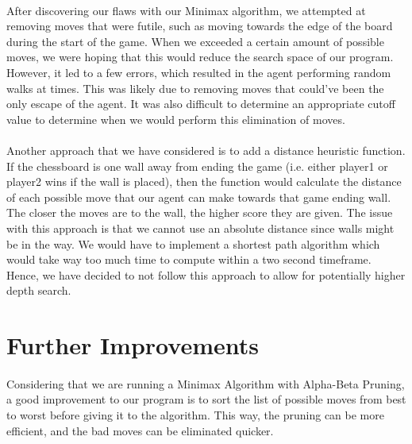 \documentclass[12pt,a4paper]{article}
\begin{document}
\paragraph{} After discovering our flaws with our Minimax algorithm, we attempted at removing moves that were futile, 
such as moving towards the edge of the board during the start of the game. 
When we exceeded a certain amount of possible moves, we were hoping that this would reduce the 
search space of our program. However, it led to a few errors, which resulted in the agent performing random walks at 
times. 
This was likely due to removing moves that could've been the only escape of the agent. It was also difficult to 
determine an appropriate cutoff value to determine when we would perform this elimination 
of moves. 
\paragraph{} Another approach that we have considered is to add a distance heuristic function. 
If the chessboard is one wall 
away from ending the game (i.e. either player1 or player2 wins if the wall is placed), then the function 
would calculate the distance of each possible move that our agent can make towards that game ending wall. 
The closer the moves are to the wall, the higher score they are given. The issue with this approach is that 
we cannot use an absolute distance since walls might be in the way. We would have to implement a shortest path 
algorithm which would take way too much time to compute within a two second timeframe. Hence, we have decided 
to not follow this approach to allow for potentially higher depth search. 


\section{Further Improvements}
\paragraph{} Considering that we are running a Minimax Algorithm with Alpha-Beta Pruning, a good improvement to our 
program is to sort the list of possible moves from best to worst before giving it to the algorithm. 
This way, the pruning can 
be more efficient, and the bad moves can be eliminated quicker. 
\end{document}
